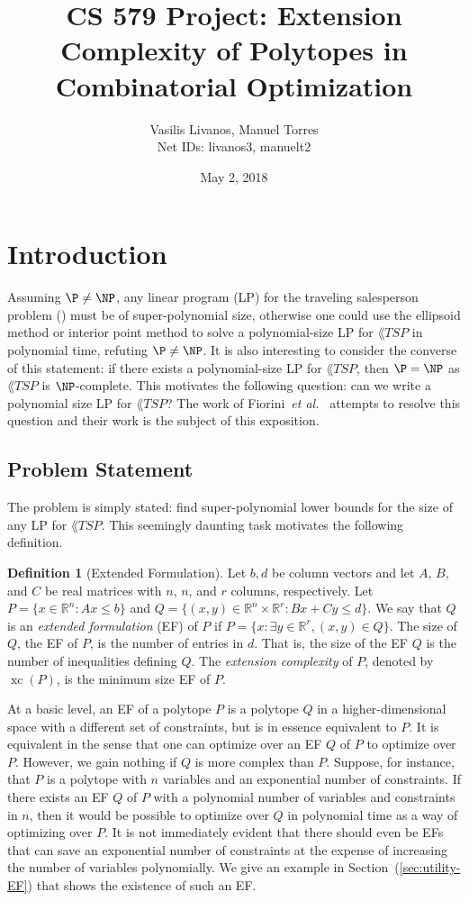 \documentclass{article}
\title{CS 579 Project: Extension Complexity of Polytopes in Combinatorial Optimization}
\author{Vasilis Livanos, Manuel Torres \\ Net IDs: livanos3, manuelt2}
\date{May 2, 2018}
\makeatletter
\theoremstyle{definition}
\newtheorem{definition}[theorem]{Definition}
\theoremstyle{remark}
\newcommand{\cetal}{\textit{et al.\@}}  %
\newcommand{\xc}{\operatorname{xc}}
\renewcommand{\R}{\mathbb{R}}
\makeatother
\begin{document}
\maketitle

\section{Introduction}

Assuming $\P \ne \NP$, any linear program (LP) for the traveling salesperson problem () must be of super-polynomial size, otherwise one could use the ellipsoid method or interior point method to solve a polynomial-size LP for $\lang{TSP}$ in polynomial time, refuting $\P \ne \NP$. It is also interesting to consider the converse of this statement: if there exists a polynomial-size LP for $\lang{TSP}$, then $\P = \NP$ as $\lang{TSP}$ is $\NP$-complete. This motivates the following question: can we write a polynomial size LP for $\lang{TSP}$? The work of Fiorini~\cetal~\cite{fiorini} attempts to resolve this question and their work is the subject of this exposition.

\subsection{Problem Statement}

The problem is simply stated: find super-polynomial lower bounds for the size of any LP for $\lang{TSP}$. This seemingly daunting task motivates the following definition. 

\begin{definition}[Extended Formulation]
Let $b,d$ be column vectors and let $A$, $B$, and $C$ be real matrices with $n$, $n$, and $r$ columns, respectively. Let $P = \{x \in \R^n : Ax \le b\}$ and $Q = \{(x,y) \in \R^n \times \R^r : Bx + Cy \le d\}$. We say that $Q$ is an \emph{extended formulation} (EF) of $P$ if $P = \{x : \exists y \in \R^r, (x,y) \in Q\}$. The size of $Q$, the EF of $P$, is the number of entries in $d$. That is, the size of the EF $Q$ is the number of inequalities defining $Q$. The \emph{extension complexity} of $P$, denoted by $\xc(P)$, is the minimum size EF of $P$.
\end{definition}

At a basic level, an EF of a polytope $P$ is a polytope $Q$ in a higher-dimensional space with a different set of constraints, but is in essence equivalent to $P$. It is equivalent in the sense that one can optimize over an EF $Q$ of $P$ to optimize over $P$. However, we gain nothing if $Q$ is more complex than $P$. Suppose, for instance, that $P$ is a polytope with $n$ variables and an exponential number of constraints. If there exists an EF $Q$ of $P$ with a polynomial number of variables and constraints in $n$, then it would be possible to optimize over $Q$ in polynomial time as a way of optimizing over $P$. It is not immediately evident that there should even be EFs that can save an exponential number of constraints at the expense of increasing the number of variables polynomially. We give an example in Section~(\ref{sec:utility-EF}) that shows the existence of such an EF.
\end{document}
